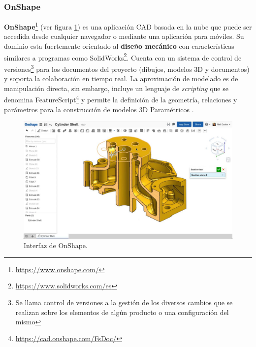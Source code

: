 \subsubsection{OnShape} 
\textbf{\Gls{OnShape}}\footnote{\url{https://www.onshape.com/}} (ver figura \ref{fig:onshape}) \citep{OnshapePlanes} es una aplicación CAD basada en la nube que puede ser accedida desde cualquier navegador o mediante una aplicación para móviles. Su dominio esta fuertemente orientado al \textbf{diseño mecánico} \citep{lardies2012criterios} con características similares a programas como \Gls{SolidWorks}\footnote{\url{https://www.solidworks.com/es}}. 
Cuenta con un sistema de control de versiones\footnote{Se llama control de versiones a la gestión de los diversos cambios que se realizan sobre los elementos de algún producto o una configuración del mismo} para los documentos del proyecto (dibujos, modelos 3D y documentos) y soporta la colaboración en tiempo real. La aproximación de modelado es de manipulación directa, sin embargo, incluye un lenguaje de \textit{scripting} que se denomina \Gls{FeatureScript}\footnote{\url{https://cad.onshape.com/FsDoc/}} y permite la definición de la geometría, relaciones y parámetros para la construcción de modelos 3D Paramétricos \citep{Alfaiate2017}.

\begin{figure}[h]
\includegraphics[width=14cm]{Img/onshape.jpg}
\centering
\caption{\footnotesize{Interfaz de OnShape.}}
\label{fig:onshape}
\end{figure}
